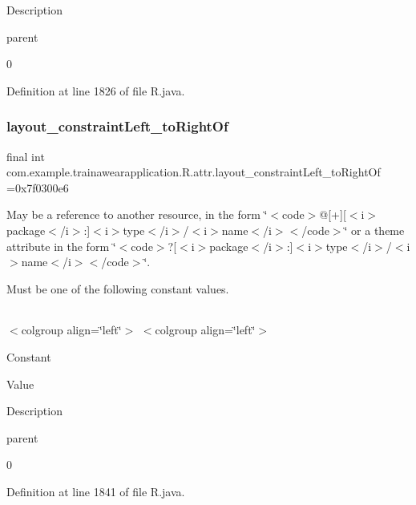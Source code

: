Description 

parent

0

Definition at line 1826 of file R.\+java.

\mbox{\label{classcom_1_1example_1_1trainawearapplication_1_1_r_1_1attr_aa1e57bb84da0b8a6fa479791d28162c5}} 
\subsubsection{\texorpdfstring{layout\_constraintLeft\_toRightOf}{layout\_constraintLeft\_toRightOf}}
{\footnotesize\ttfamily final int com.\+example.\+trainawearapplication.\+R.\+attr.\+layout\+\_\+constraint\+Left\+\_\+to\+Right\+Of =0x7f0300e6\hspace{0.3cm}{\ttfamily [static]}}

May be a reference to another resource, in the form \char`\"{}$<$code$>$@\mbox{[}+\mbox{]}\mbox{[}$<$i$>$package$<$/i$>$\+:\mbox{]}$<$i$>$type$<$/i$>$/$<$i$>$name$<$/i$>$$<$/code$>$\char`\"{} or a theme attribute in the form \char`\"{}$<$code$>$?\mbox{[}$<$i$>$package$<$/i$>$\+:\mbox{]}$<$i$>$type$<$/i$>$/$<$i$>$name$<$/i$>$$<$/code$>$\char`\"{}. 

Must be one of the following constant values.

\tabulinesep=1mm
\begin{longtabu}spread 0pt [c]{*{0}{|X[-1]}|}
\hline
\end{longtabu}
$<$colgroup align=\char`\"{}left\char`\"{}$>$ $<$colgroup align=\char`\"{}left\char`\"{}$>$ 

Constant

Value

Description 

parent

0

Definition at line 1841 of file R.\+java.

\mbox{\label{classcom_1_1example_1_1trainawearapplication_1_1_r_1_1attr_ad8fe509ea3eec997049299cb20bae651}} 
